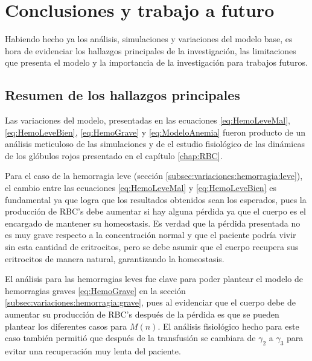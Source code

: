 \chapter{Conclusiones y trabajo a futuro}\label{chap:Conclusiones}

Habiendo hecho ya los análisis, simulaciones y variaciones del modelo base, es hora de evidenciar los hallazgos principales de la investigación, las limitaciones que presenta el modelo y la importancia de la investigación para trabajos futuros.

\section{Resumen de los hallazgos principales}

Las variaciones del modelo, presentadas en las ecuaciones \ref{eq:HemoLeveMal}, \ref{eq:HemoLeveBien}, \ref{eq:HemoGrave} y \ref{eq:ModeloAnemia} fueron producto de un análisis meticuloso de las simulaciones y de el estudio fisiológico de las dinámicas de los glóbulos rojos presentado en el capítulo \ref{chap:RBC}. 

Para el caso de la hemorragia leve (sección \ref{subsec:variaciones:hemorragia:leve}), el cambio entre las ecuaciones \ref{eq:HemoLeveMal} y \ref{eq:HemoLeveBien} es fundamental ya que logra que los resultados obtenidos sean los esperados, pues la producción de RBC's debe aumentar si hay alguna pérdida ya que el cuerpo es el encargado de mantener su homeostasis. Es verdad que la pérdida presentada no es muy grave respecto a la concentración normal y que el paciente podría vivir sin esta cantidad de eritrocitos, pero se debe asumir que el cuerpo recupera sus eritrocitos de manera natural, garantizando la homeostasis.

El análisis para las hemorragias leves fue clave para poder plantear el modelo de hemorragias graves \ref{eq:HemoGrave} en la sección \ref{subsec:variaciones:hemorragia:grave}, pues al evidenciar que el cuerpo debe de aumentar su producción de RBC's después de la pérdida es que se pueden plantear los diferentes casos para $M(n)$. El análisis fisiológico hecho para este caso también permitió que después de la transfusión se cambiara de $\gamma_2$ a $\gamma_3$ para evitar una recuperación muy lenta del paciente.

